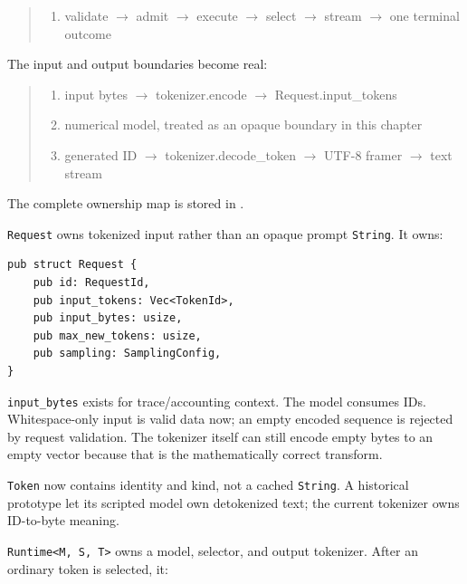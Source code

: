 \begin{quote}
\begin{enumerate}
\item validate  \(\longrightarrow\)  admit  \(\longrightarrow\)  execute  \(\longrightarrow\)  select  \(\longrightarrow\)  stream  \(\longrightarrow\)  one terminal outcome
\end{enumerate}
\end{quote}

The input and output boundaries become real:

\begin{quote}
\begin{enumerate}
\item input bytes  \(\longrightarrow\)  tokenizer.encode  \(\longrightarrow\)  Request.input\_tokens
\item numerical model, treated as an opaque boundary in this chapter
\item generated ID  \(\longrightarrow\)  tokenizer.decode\_token  \(\longrightarrow\)  UTF-8 framer  \(\longrightarrow\)  text stream
\end{enumerate}
\end{quote}

The complete ownership map is stored in
\href{https://github.com/hermonai/inside-the-llm-engine/blob/astra-visual-rewrite/diagrams/tokenizer/engine0-token-ownership.txt}{\texttt{}}.

\texttt{Request} owns tokenized input rather than an opaque prompt \texttt{String}. It
owns:

\begin{verbatim}
pub struct Request {
    pub id: RequestId,
    pub input_tokens: Vec<TokenId>,
    pub input_bytes: usize,
    pub max_new_tokens: usize,
    pub sampling: SamplingConfig,
}
\end{verbatim}

\texttt{input\_bytes} exists for trace/accounting context. The model
consumes IDs. Whitespace-only input is valid data now; an empty encoded
sequence is rejected by request validation. The tokenizer itself can
still encode empty bytes to an empty vector because that is the
mathematically correct transform.

\texttt{Token} now contains identity and kind, not a cached
\texttt{String}. A historical prototype let its scripted
model own detokenized text; the current tokenizer owns ID-to-byte
meaning.

\texttt{Runtime\textless{}M,\ S,\ T\textgreater{}} owns a model,
selector, and output tokenizer. After an ordinary token is selected, it:

